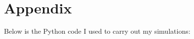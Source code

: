 \documentclass[a4paper,11pt]{article}
\theoremstyle{definition}
\begin{document}



\printbibliography

\section{Appendix}
Below is the Python code I used to carry out my simulations:
\end{document}
